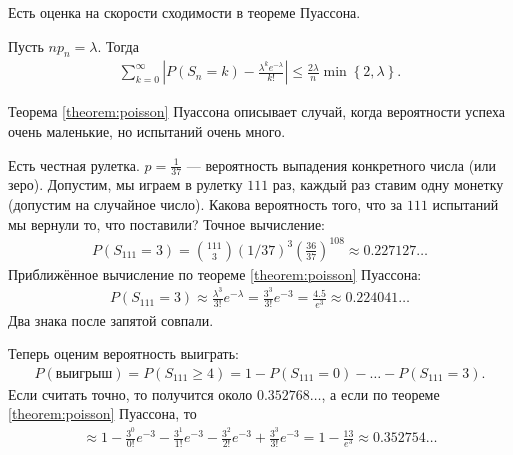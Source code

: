 Есть оценка на скорости сходимости в теореме Пуассона.

\begin{thm}[%
 Прохорова]
 Пусть $np_n = \lambda$. Тогда
 \begin{align*}
  \sum_{k=0}^{\infty} \left| P(S_n = k) - \frac{\lambda^{k}e^{-\lambda}}{k!}\right| \leqslant \frac{2\lambda}{n} \min \left\{ 2, \lambda \right\}.
 \end{align*} 
\end{thm}

Теорема \ref{theorem:poisson} Пуассона описывает случай, когда вероятности успеха очень маленькие, но испытаний очень много.

\begin{exmpl*}
 Есть честная рулетка. $p = \frac{1}{37}$ --- вероятность выпадения конкретного числа (или зеро). Допустим, мы играем в рулетку $111$ раз, каждый раз ставим одну монетку (допустим на случайное число). Какова вероятность того, что за $111$ испытаний мы вернули то, что поставили? Точное вычисление:
 \begin{align*}
  P(S_{111} = 3) = \binom {111} 3 \left( 1 / 37 \right)^{3} \left( \frac{36}{37} \right)^{108} \approx 0.227127\ldots
 \end{align*} Приближённое вычисление по теореме \ref{theorem:poisson} Пуассона:
 \begin{align*}
  P(S_{111} = 3) \approx \frac{\lambda^{3}}{3!}e^{-\lambda} = \frac{3^{3}}{3!} e^{-3} = \frac{4.5}{e^{3}} \approx 0.224041\ldots
 \end{align*} Два знака после запятой совпали.

 Теперь оценим вероятность выиграть:
 \begin{align*}
  P(\text{выигрыш}) = P(S_{111} \geqslant 4) = 1 - P(S_{111} = 0) - \ldots - P(S_{111} = 3)
 .\end{align*} Если считать точно, то получится около $0.352768\ldots$, а если по теореме \ref{theorem:poisson} Пуассона, то
 \begin{align*}
  \approx 1 - \frac{3^{0}}{0!}e^{-3} - \frac{3^{1}}{1!}e^{-3} - \frac{3^{2}}{2!}e^{-3} + \frac{3^{3}}{3!}e^{-3} = 1 - \frac{13}{e^{3}} \approx 0.352754\ldots
 \end{align*} 
\end{exmpl*}

